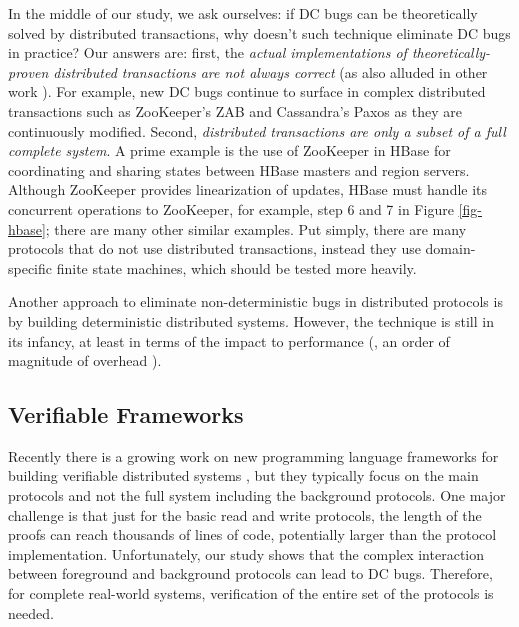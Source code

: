 \fi





In the middle of our study, we ask ourselves: if DC bugs can be
theoretically solved by distributed transactions, why doesn't such
technique eliminate DC bugs in practice?  Our answers are:
%
first, the {\em actual implementations of theoretically-proven
  distributed transactions are not always correct}
(as also alluded in other work \cite{Burrows06-Chubby, Ongaro+14-Raft}).
For example, new
DC bugs continue to surface in complex distributed transactions such
as ZooKeeper's ZAB and Cassandra's Paxos as they are continuously
modified.
%
Second, {\em distributed transactions are only a subset of a full
  complete system}.  A prime example is the use of ZooKeeper in HBase
for coordinating and sharing states between HBase masters and region
servers.  Although ZooKeeper provides linearization of updates, HBase
must handle its concurrent operations to ZooKeeper,
for example, step 6 and 7 in Figure \ref{fig-hbase};
there are many other similar examples.%
%
Put simply, there are many protocols that do not use distributed
transactions, instead they use domain-specific finite state machines,
which should be tested more heavily.


Another approach to eliminate non-deterministic bugs in distributed
protocols is by building deterministic distributed systems.  However, the
technique is still in its infancy, at least in terms of the impact to
performance (\eg, an order of magnitude of overhead \cite{Hunt+13-DDOS}).




\subsection{Verifiable Frameworks}
\label{less-others}

Recently there is a growing work on new programming language frameworks
for building verifiable distributed systems \cite{Desai+13-PLang,
Hawblitzel+15-IronFleet, Wilcox+15-Verdi}, but they typically focus on the
main protocols  and not the full system including
the background protocols.  One major challenge is that 
just for the basic read and write protocols,
the length of the
proofs can reach thousands of lines of code, potentially
larger than the protocol implementation.
Unfortunately, our study shows that the complex
interaction between foreground and background protocols can lead to DC
bugs.  Therefore, for complete real-world systems, verification of the
entire set of the protocols is needed.
%

